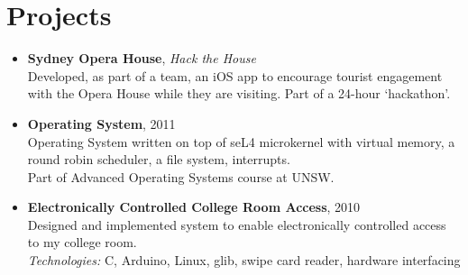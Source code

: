 
\vspace{-0.6cm}
\section*{Projects}
\vspace{-0.2cm}
\begin{itemize}
\item \textbf{Sydney Opera House}, \textit{Hack the House} \\
Developed, as part of a team, an iOS app to encourage tourist engagement with
the Opera House while they are visiting. Part of a 24-hour `hackathon'.

\item \textbf{Operating System}, 2011\\
Operating System written on top of seL4 microkernel with 
virtual memory, a round robin scheduler, a file system, interrupts. \\
Part of Advanced Operating Systems course at UNSW.   

\item \textbf{Electronically Controlled College Room Access}, 2010\\
Designed and implemented system to enable electronically controlled access to my college room.\\
\textit{Technologies:} C, Arduino, Linux, glib, swipe card reader, hardware interfacing
\end{itemize}
